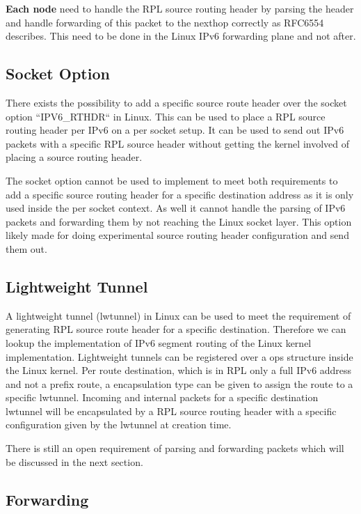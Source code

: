 \documentclass[letterpaper]{article}
\begin{document}
{\bf Each node} need to handle the RPL source routing header by parsing the header and handle forwarding of this packet to the nexthop correctly as RFC6554 describes.
This need to be done in the Linux IPv6 forwarding plane and not after.

\subsection{Socket Option}

There exists the possibility to add a specific source route header over the socket option ``IPV6\_RTHDR`` in Linux.
This can be used to place a RPL source routing header per IPv6 on a per socket setup.
It can be used to send out IPv6 packets with a specific RPL source header without getting the kernel involved of placing a source routing header.

The socket option cannot be used to implement to meet both requirements to add a specific source routing header for a specific destination address as it is only used inside the per socket context.
As well it cannot handle the parsing of IPv6 packets and forwarding them by not reaching the Linux socket layer.
This option likely made for doing experimental source routing header configuration and send them out.

\subsection{Lightweight Tunnel}

A lightweight tunnel (lwtunnel) in Linux can be used to meet the requirement of generating RPL source route header for a specific destination.
Therefore we can lookup the implementation of IPv6 segment routing \cite{srh} of the Linux kernel implementation.
Lightweight tunnels can be registered over a ops structure inside the Linux kernel.
Per route destination, which is in RPL only a full IPv6 address and not a prefix route, a encapsulation type can be given to assign the route to a specific lwtunnel.
Incoming and internal packets for a specific destination lwtunnel will be encapsulated by a RPL source routing header with a specific configuration given by the lwtunnel at creation time.

There is still an open requirement of parsing and forwarding packets which will be discussed in the next section.

\subsection{Forwarding}
\end{document}
